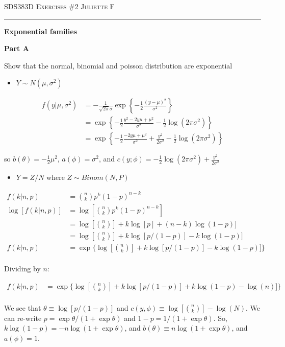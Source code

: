 \documentclass[12pt]{amsart}
\begin{document}
\thispagestyle{empty}

{\scshape SDS383D} \hfill {\scshape \Large Exercises \#2} \hfill {\scshape Juliette F}
 \medskip
\hrule
\bigskip
\bigskip

{\bf \large Exponential families} 
\bigskip



{\bf Part A} 
\bigskip

Show that the normal, binomial and poisson distribution are exponential

\begin{itemize}
    \item $Y \sim N(\mu, \sigma^2) $
\end{itemize}
\bigskip
\bigskip

\begin{align*}
f(y|\mu,\sigma^2)&= -\frac{1}{\sqrt{2\pi}\sigma} \exp \left\{ -\frac{1}{2} \frac{(y-\mu)^2}{\sigma^2}\right\}\\
&=\exp \left\{ -\frac{1}{2} \frac{y^2-2y\mu + \mu^2}{\sigma^2}  -\frac{1}{2}\log ( 2\pi\sigma^2)\right\} \\
&=  \exp \left\{ -\frac{1}{2} \frac{-2y\mu + \mu^2}{\sigma^2} + \frac{y^2}{2\sigma^2} -\frac{1}{2}\log ( 2\pi\sigma^2)\right\}
\end{align*}

\bigskip
\bigskip

so $b(\theta) = -\frac{1}{2}\mu^2$, $a(\phi) = \sigma^2$, and $ c(y;\phi) =-\frac{1}{2}\log ( 2\pi\sigma^2) + \frac{y^2}{2\sigma^2} $

\bigskip
\bigskip


\begin{itemize}
    \item $Y=Z/N $ where $Z \sim Binom(N, P)$
\end{itemize}
\medskip


\begin{align*}
f(k|n,p)&= {n \choose k} p^k (1-p)^{n-k}\\
\log[f(k|n,p)]&= \log[{n \choose k} p^k (1-p)^{n-k}]\\
&=\log[{n \choose k}]+k\log[p] + (n-k) \log(1-p)]\\
&=\log[{n \choose k}]+k\log[p/(1-p)] -k \log(1-p)]\\
f(k|n,p)&= \exp\{\log[{n \choose k}]+k\log[p/(1-p)] -k \log(1-p)]\}
\end{align*}\\

Dividing by $n$:

\begin{align*}
f(k|n,p)&= \exp\{\log[{n \choose k}]+k\log[p/(1-p)] +k \log(1-p) - \log(n)]\}
\end{align*}\\
We see that $\theta \equiv\log[p/(1-p)] $ and $c(y, \phi) \equiv \log[{n \choose k}] - \log(N) $. We can re-write $p = \exp\theta/(1+\exp\theta)$ and $1-p = 1/(1+\exp\theta)$. So, $k \log(1-p) = -n \log(1+\exp\theta)$, and $b(\theta) \equiv n \log(1+\exp\theta)$, and $a(\phi)=1 $. 
\end{document}
